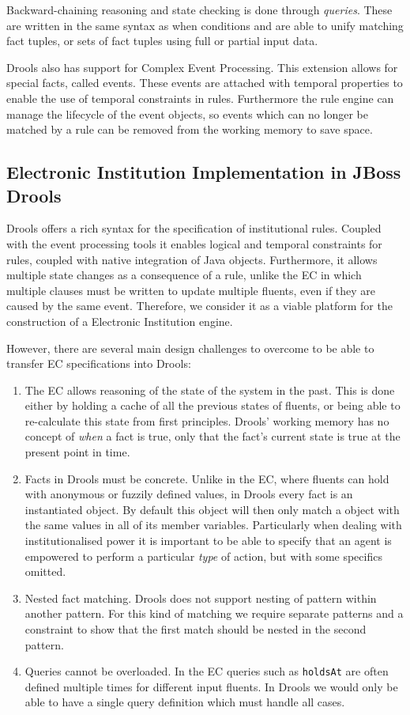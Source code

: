 Backward-chaining reasoning and state checking is done through \emph{queries}.
These are written in the same syntax as when conditions and are able to unify
matching fact tuples, or sets of fact tuples using full or partial input data. 

Drools also has support for Complex Event Processing. This extension allows for
special facts, called events. These events are attached with temporal properties
to enable the use of temporal constraints in rules. Furthermore the rule engine
can manage the lifecycle of the event objects, so events which can no longer be
matched by a rule can be removed from the working memory to save space.

\subsection{Electronic Institution Implementation in JBoss Drools}

Drools offers a rich syntax for the specification of institutional rules.
Coupled with the event processing tools it enables logical and temporal
constraints for rules, coupled with native integration of Java objects.
Furthermore, it allows multiple state changes as a consequence of a rule, unlike
the \ac{EC} in which multiple clauses must be written to update multiple
fluents, even if they are caused by the same event. Therefore, we consider it as
a viable platform for the construction of a Electronic Institution engine.

However, there are several main design challenges to overcome to be able to transfer
\ac{EC} specifications into Drools:
\begin{enumerate}
\item The \ac{EC} allows reasoning of the state of the system in the past. This is
done either by holding a cache of all the previous states of fluents, or being
able to re-calculate this state from first principles. Drools' working memory
has no concept of \emph{when} a fact is true, only that the fact's current
state is true at the present point in time.
\item Facts in Drools must be concrete. Unlike in the \ac{EC}, where fluents can
hold with anonymous or fuzzily defined values, in Drools every fact is an
instantiated object. By default this object will then only match a object with
the same values in all of its member variables. Particularly when dealing with
institutionalised power it is important to be able to specify that an agent is
empowered to perform a particular \emph{type} of action, but with some specifics
omitted.
\item Nested fact matching. Drools does not support nesting of pattern within
another pattern. For this kind of matching we require separate patterns and a
constraint to show that the first match should be nested in the second pattern.
\item Queries cannot be overloaded. In the \ac{EC} queries such as \texttt{holdsAt}
are often defined multiple times for different input fluents. In Drools we would
only be able to have a single query definition which must handle all cases.
\end{enumerate}

